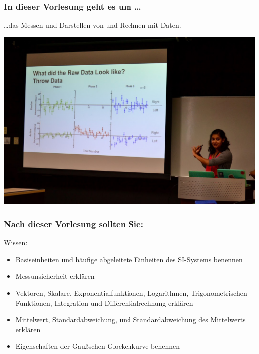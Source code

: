 \documentclass{beamer}
\begin{document}
\begin{frame}
\frametitle{In dieser Vorlesung geht es um \dots}

\dots das \textcolor{theme}{Messen} und \textcolor{theme}{Darstellen} von und \textcolor{theme}{Rechnen} mit Daten.

\begin{center}
\includegraphics[width=\textwidth]{student_presenting.jpg}

\end{center}

 
\end{frame}




\begin{frame}

\frametitle{Nach dieser Vorlesung sollten Sie:}



\begin{block}{Wissen:}
\begin{itemize}
\item
Basiseinheiten und häufige abgeleitete Einheiten des SI-Systems benennen
\item
Messunsicherheit erklären
\item
 Vektoren, Skalare, Exponentialfunktionen, Logarithmen, Trigonometrischen Funktionen, Integration und Differentialrechnung erklären
\item 
Mittelwert, Standardabweichung, und Standardabweichung des Mittelwerts erklären 
\item
Eigenschaften der Gaußschen Glockenkurve benennen
\end{itemize}
\end{block}

\end{frame}
\end{document}
